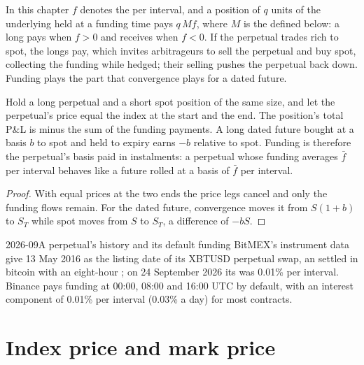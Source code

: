 In this chapter $f$ denotes the  per interval, and a position of $q$ units of the
underlying held at a funding time pays $q\,M f$, where $M$ is the  defined below: a long pays
when $f > 0$ and receives when $f < 0$. If the perpetual trades rich to spot, the longs pay, which
invites arbitrageurs to sell the perpetual and buy spot, collecting the funding while hedged; their
selling pushes the perpetual back down. Funding plays the part that convergence plays for a dated future.

\begin{proposition}\label{prop:m3:perpetual-futures:roll}
Hold a long perpetual and a short spot position of the same size, and let the perpetual's price equal the
index at the start and the end. The position's total P\&L is minus the sum of the funding payments. A long
dated future bought at a basis $b$ to spot and held to expiry earns $-b$ relative to spot. Funding is
therefore the perpetual's basis paid in instalments: a perpetual whose funding averages $\bar f$ per interval
behaves like a future rolled at a basis of $\bar f$ per interval.
\end{proposition}

\begin{proof}
With equal prices at the two ends the price legs cancel and only the funding flows remain. For the dated
future, convergence moves it from $S(1+b)$ to $S_T$ while spot moves from $S$ to $S_T$, a difference of $-bS$.
\end{proof}

\begin{dated}{2026-09}{A perpetual's history and its default funding}\label{dat:m3:perpetual-futures:bitmex}
BitMEX's instrument data give 13 May 2016 as the listing date of its XBTUSD perpetual swap, an  settled in bitcoin with an eight-hour ; on 24 September 2026 its  was
0.01\% per interval. Binance pays funding at 00:00, 08:00 and 16:00 UTC by default, with an interest
component of 0.01\% per interval (0.03\% a day) for most contracts.
\end{dated}

\section{Index price and mark price}

